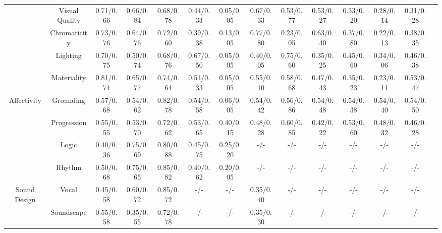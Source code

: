 \documentclass{article}
\begin{document}
\begin{table}[t]
{\begin{tabular}{cccccccccccccc}
\rowcolor[HTML]{E6F2FF}  
& Visual Quality & 0.71/0.66 & 0.66/0.84 & 0.68/0.78 & 0.44/0.33 & 0.05/0.05 & 0.67/0.33 & 0.53/0.77 & 0.53/0.27 & 0.33/0.20 & 0.28/0.14 & 0.31/0.28 \\ 
\rowcolor[HTML]{E6F2FF} 
& Chromaticity & 0.73/0.76 & 0.64/0.76 & 0.72/0.60 & 0.39/0.38 & 0.13/0.05 & 0.77/0.80 & 0.23/0.05 & 0.63/0.40 & 0.37/0.80 & 0.22/0.13 & 0.38/0.35 \\ 
\rowcolor[HTML]{E6F2FF} 
& Lighting & 0.70/0.75 & 0.50/0.74 & 0.68/0.76 & 0.67/0.50 & 0.05/0.05 & 0.40/0.05 & 0.75/0.60 & 0.35/0.25 & 0.45/0.60 & 0.34/0.06 & 0.46/0.38 \\ 
\rowcolor[HTML]{E6F2FF} 
\multirow{-4}{*}{Aesthetics}
& Materiality & 0.81/0.74 & 0.65/0.77 & 0.74/0.64 & 0.51/0.33 & 0.05/0.05 & 0.55/0.10 & 0.58/0.68 & 0.47/0.43 & 0.35/0.23 & 0.23/0.11 & 0.53/0.47 \\ 


\multirow{2}{*}{Affectivity} 
& Grounding & 0.57/0.68 & 0.54/0.62 & 0.82/0.78 & 0.54/0.58 & 0.06/0.05 & 0.54/0.42 & 0.56/0.86 & 0.54/0.48 & 0.54/0.38 & 0.54/0.40 & 0.54/0.50 \\ 
& Progression & 0.55/0.55 & 0.53/0.70 & 0.72/0.62 & 0.53/0.65 & 0.40/0.15 & 0.48/0.28 & 0.60/0.85 & 0.42/0.22 & 0.53/0.60 & 0.48/0.32 & 0.46/0.28 \\ 	

\rowcolor[HTML]{E6F2FF} 
& Logic & 0.40/0.36 & 0.75/0.69 & 0.80/0.88 & 0.45/0.75 & 0.25/0.20 & -/- & -/- & -/- & -/- & -/- & -/- \\ 
\rowcolor[HTML]{E6F2FF} 
\multirow{-2}{*}{\Centerstack{Multi-Shot}} 
& Rhythm & 0.50/0.68 & 0.75/0.65 & 0.85/0.82 & 0.40/0.62 & 0.20/0.05 & -/- & -/- & -/- & -/- & -/- & -/- \\ 


\multirow{2}{*}{Sound Design} 
& Vocal & 0.45/0.58 & 0.60/0.72 & 0.85/0.72 & -/- & -/- & 0.35/0.40 & -/- & -/- & -/- & -/- & -/- \\ 
& Soundscape & 0.55/0.58 & 0.35/0.55 & 0.72/0.78 & -/- & -/- & 0.35/0.30 & -/- & -/- & -/- & -/- & -/- \\ 

\hline
\end{tabular}
}
\label{tab:win_ratio}
\end{table}
\end{document}
